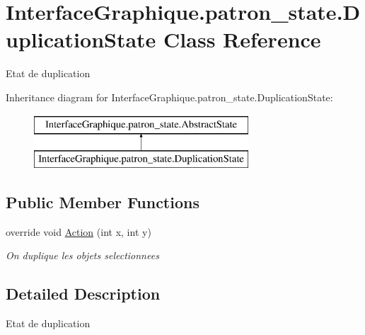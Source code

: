 \hypertarget{class_interface_graphique_1_1patron__state_1_1_duplication_state}{\section{Interface\-Graphique.\-patron\-\_\-state.\-Duplication\-State Class Reference}
\label{class_interface_graphique_1_1patron__state_1_1_duplication_state}
}


Etat de duplication  


Inheritance diagram for Interface\-Graphique.\-patron\-\_\-state.\-Duplication\-State\-:\begin{figure}[H]
\begin{center}
\leavevmode
\includegraphics[height=2.000000cm]{class_interface_graphique_1_1patron__state_1_1_duplication_state}
\end{center}
\end{figure}
\subsection*{Public Member Functions}
\begin{DoxyCompactItemize}
\item 
override void \hyperlink{class_interface_graphique_1_1patron__state_1_1_duplication_state_a3e4ab1c3a8bd3d03b822c66d7597e068}{Action} (int x, int y)
\begin{DoxyCompactList}\small\item\em On duplique les objets selectionnees \end{DoxyCompactList}\end{DoxyCompactItemize}


\subsection{Detailed Description}
Etat de duplication 



